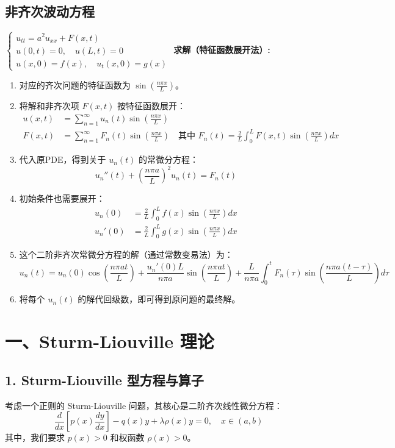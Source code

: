 \documentclass{article}
\begin{document}
	\subsection{非齐次波动方程}
	$\begin{cases}
		u_{tt} = a^2 u_{xx} + F(x,t) \\
		u(0,t)=0, \quad u(L,t)=0 \\
		u(x,0)=f(x), \quad u_t(x,0)=g(x)
	\end{cases}$
	\textbf{求解（特征函数展开法）:}
	\begin{enumerate}
		\item 对应的齐次问题的特征函数为 $\sin\left(\frac{n\pi x}{L}\right)$。
		\item 将解和非齐次项 $F(x,t)$ 按特征函数展开：
		\begin{align*}
			u(x,t) &= \sum_{n=1}^{\infty} u_n(t) \sin\left(\frac{n\pi x}{L}\right) \\
			F(x,t) &= \sum_{n=1}^{\infty} F_n(t) \sin\left(\frac{n\pi x}{L}\right) \quad \text{其中 } F_n(t) = \frac{2}{L}\int_0^L F(x,t)\sin\left(\frac{n\pi x}{L}\right)dx
		\end{align*}
		\item 代入原PDE，得到关于 $u_n(t)$ 的常微分方程：
		$$
		u_n''(t) + \left(\frac{n\pi a}{L}\right)^2 u_n(t) = F_n(t)
		$$
		\item 初始条件也需要展开：
		\begin{align*}
			u_n(0) &= \frac{2}{L}\int_0^L f(x) \sin\left(\frac{n\pi x}{L}\right) dx \\
			u_n'(0) &= \frac{2}{L}\int_0^L g(x) \sin\left(\frac{n\pi x}{L}\right) dx
		\end{align*}
		\item 这个二阶非齐次常微分方程的解（通过常数变易法）为：
		$$
		u_n(t) = u_n(0)\cos\left(\frac{n\pi a t}{L}\right) + \frac{u_n'(0)L}{n\pi a}\sin\left(\frac{n\pi a t}{L}\right) + \frac{L}{n\pi a}\int_0^t F_n(\tau)\sin\left(\frac{n\pi a(t-\tau)}{L}\right)d\tau
		$$
		\item 将每个 $u_n(t)$ 的解代回级数，即可得到原问题的最终解。
	\end{enumerate}
	\section*{一、Sturm-Liouville 理论}
	
	\subsection*{1. Sturm-Liouville 型方程与算子}
	考虑一个正则的 Sturm-Liouville 问题，其核心是二阶齐次线性微分方程：
	\[
	\frac{d}{dx} \left[ p(x) \frac{dy}{dx} \right] - q(x)y + \lambda \rho(x)y = 0, \quad x \in (a, b)
	\]
	其中，我们要求 $p(x) > 0$ 和权函数 $\rho(x) > 0$。
	
\end{document}
